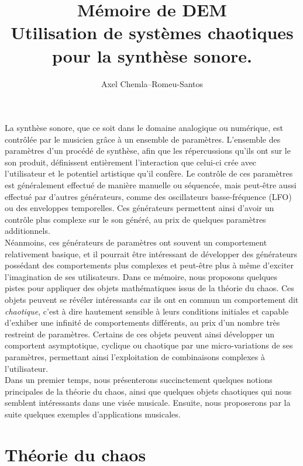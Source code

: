 \documentclass[12pt,a4paper]{article}
\begin{document}
\title{Mémoire de DEM \\ Utilisation de systèmes chaotiques pour la synthèse sonore.}
\author{Axel Chemla--Romeu-Santos}
\maketitle


La synthèse sonore, que ce soit dans le domaine analogique ou numérique, est contrôlée par le musicien grâce à un ensemble de paramètres. L'ensemble des paramètres d'un procédé de synthèse, afin que les répercussions qu'ils ont sur le son produit, définissent entièrement l'interaction que celui-ci crée avec l'utilisateur et le potentiel artistique qu'il confère. Le contrôle de ces paramètres est généralement effectué de manière manuelle ou séquencée, mais peut-être aussi effectué par d'autres générateurs, comme des oscillateurs basse-fréquence (LFO) ou des enveloppes temporelles. Ces générateurs permettent ainsi d'avoir un contrôle plus complexe sur le son généré, au prix de quelques paramètres additionnels. \\

Néanmoins, ces générateurs de paramètres ont souvent un comportement  relativement basique, et il pourrait être intéressant de développer des générateurs possédant des comportements plus complexes et peut-être plus à même d'exciter l'imagination de ses utilisateurs. Dans ce mémoire, nous proposons quelques pistes pour appliquer des objets mathématiques issus de la théorie du chaos. Ces objets peuvent se révéler intéressants car ils ont en commun un comportement dit \textit{chaotique}, c'est à dire hautement sensible à leurs conditions initiales et capable d'exhiber une infinité de comportements différents, au prix d'un nombre très restreint de paramètres. Certains de ces objets peuvent ainsi développer un comportent asymptotique, cyclique ou chaotique par une micro-variations de ses paramètres, permettant ainsi l'exploitation de combinaisons complexes à l'utilisateur.\\
Dans un premier temps, nous présenterons succinctement quelques notions principales de la théorie du chaos, ainsi que quelques objets chaotiques qui nous semblent intéressants dans une visée musicale. Ensuite, nous proposerons par la suite quelques exemples d'applications musicales.  

\section{Théorie du chaos}
\end{document}
